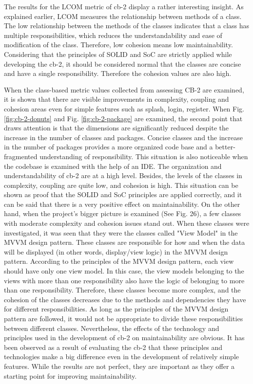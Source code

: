 The results for the LCOM metric of cb-2 display a rather interesting insight.
As explained earlier, LCOM measures the relationship between methods of a class. The low relationship between the methods of the classes indicates that a class has multiple responsibilities, which reduces the understandability and ease of modification of the class. Therefore, low cohesion means low maintainability. Considering that the principles of SOLID and SoC are strictly applied while developing the cb-2, it should be considered normal that the classes are concise and have a single responsibility. Therefore the cohesion values are also high. 

When the class-based metric values collected from assessing CB-2 are examined, it is shown that there are visible improvements in complexity, coupling and cohesion areas even for simple features such as splash, login, register. When Fig. \ref{fig:cb-2-donuts} and Fig. \ref{fig:cb-2-package} are examined, the second point that draws attention is that the dimensions are significantly reduced despite the increase in the number of classes and packages. Concise classes and the increase in the number of packages provides a more organized code base and a better-fragmented understanding of responsibility. This situation is also noticeable when the codebase is examined with the help of an IDE. The organization and understandability of cb-2 are at a high level. Besides, the levels of the classes in complexity, coupling are quite low, and cohesion is high. This situation can be shown as proof that the SOLID and SoC principles are applied correctly, and it can be said that there is a very positive effect on maintainability. On the other hand, when the project's bigger picture is examined (See Fig. 26), a few classes with moderate complexity and cohesion issues stand out. When these classes were investigated, it was seen that they were the classes called "View Model" in the MVVM design pattern. These classes are responsible for how and when the data will be displayed (in other words, display/view logic) in the MVVM design pattern. According to the principles of the MVVM design pattern, each view should have only one view model. In this case, the view models belonging to the views with more than one responsibility also have the logic of belonging to more than one responsibility. Therefore, these classes become more complex, and the cohesion of the classes decreases due to the methods and dependencies they have for different responsibilities. As long as the principles of the MVVM design pattern are followed, it would not be appropriate to divide these responsibilities between different classes. Nevertheless, the effects of the technology and principles used in the development of cb-2 on maintainability are obvious. It has been observed as a result of evaluating the cb-2 that these principles and technologies make a big difference even in the development of relatively simple features. While the results are not perfect, they are important as they offer a starting point for improving maintainability.